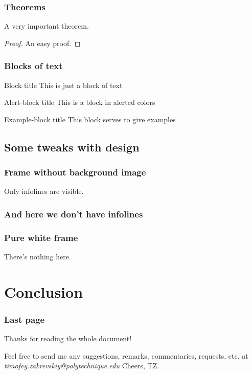 \documentclass{beamer}
\begin{document}
\begin{frame}
\frametitle{Theorems}
\begin{theorem}
A very important theorem.
\end{theorem}
\begin{proof}
An easy proof.
\end{proof}
\end{frame}


\begin{frame}
\frametitle{Blocks of text}
\begin{block}{Block title}
This is just a block of text
\end{block}

\begin{alertblock}{Alert-block title}
This is a block in alerted colors
\end{alertblock}

\begin{exampleblock}{Example-block title}
This block serves to give examples
\end{exampleblock}
\end{frame}

\subsection{Some tweaks with design}
{
\begin{frame}
\frametitle{Frame without background image}


Only infolines are visible.
\end{frame}
}

{
\begin{frame}
\frametitle{And here we don't have infolines}
\end{frame}
}

{
\begin{frame}
\frametitle{Pure white frame}

There's nothing here.

\end{frame}
}

\section{Conclusion}
\begin{frame}
\frametitle{Last page}
Thanks for reading the whole document!

Feel free to send me any suggestions, remarks, commentaries, requests, etc. at \textit{{\color{Xblue}timofey.zakrevskiy@polytechnique.edu}}
\vfill
Cheers, TZ.
\end{frame}
\end{document}
